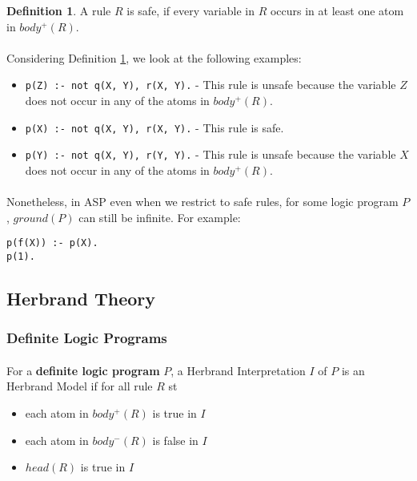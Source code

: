 \documentclass{article}
\theoremstyle{plain}
\theoremstyle{definition}
\newtheorem{defn}[thm]{Definition} %
\begin{document}
\begin{multicols}{2}
\begin{defn}\label{defn:SafeRule}
A rule $R$ is safe, if every variable in $R$ occurs in at least one atom in $body^+(R)$. 
\end{defn}

\paragraph{} Considering Definition \ref{defn:SafeRule}, we look at the following examples:

\begin{itemize}
\item \lstinline{p(Z) :- not q(X, Y), r(X, Y).} - This rule is unsafe because the variable $Z$ does not occur in any of the atoms in $body^+(R)$.
\item \lstinline{p(X) :- not q(X, Y), r(X, Y).} - This rule is safe.
\item \lstinline{p(Y) :- not q(X, Y), r(Y, Y).} - This rule is unsafe because the variable $X$ does not occur in any of the atoms in $body^+(R)$.
\end{itemize}

\paragraph{} Nonetheless, in ASP even when we restrict to safe rules, for some logic program $P$, $ground(P)$ can still be infinite. For example:

\begin{lstlisting}
p(f(X)) :- p(X).
p(1).
\end{lstlisting}

\subsection{Herbrand Theory}

\subsubsection{Definite Logic Programs}

\paragraph{} For a \textbf{definite logic program} $P$, a Herbrand Interpretation $I$ of $P$ is an Herbrand Model if for all rule $R$ st

\begin{itemize}
\item each atom in $body^+(R)$ is true in $I$
\item each atom in $body^-(R)$ is false in $I$
\item $head(R)$ is true in $I$
\end{itemize}


\end{multicols}
\end{document}
